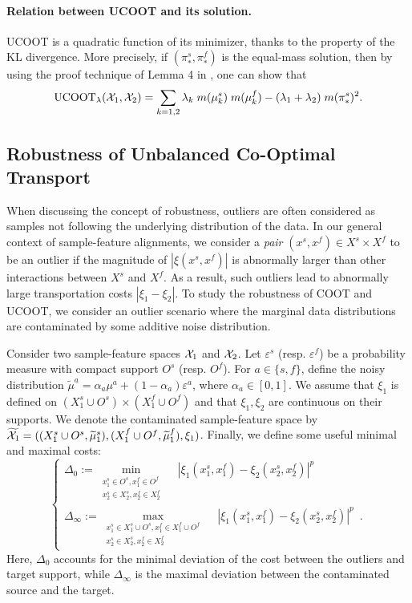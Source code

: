 \paragraph{Relation between UCOOT and its solution.}
UCOOT is a quadratic function of its minimizer, thanks to the property of the
KL divergence. More precisely, if $(\pi_*^s, \pi_*^f)$ is the equal-mass solution,
then by using the proof technique of Lemma 4 in \citep{Khiem20}, one can show that
\begin{align}
  \label{eq:ucoot_minimizer_minimum}
  \text{UCOOT}_{\lambda}(\mathcal X_1, \mathcal X_2) =
  \sum_{k=1, 2} \lambda_k \; m(\mu_k^s) \; m(\mu_k^f) - (\lambda_1  + \lambda_2) \; m(\pi^s_*)^2.
\end{align}

\subsection{Robustness of Unbalanced Co-Optimal Transport} \label{sec:robustness}
When discussing the concept of robustness, outliers are often considered as samples
not following the underlying distribution of the data. In our general context of
sample-feature alignments, we consider a \emph{pair} $(x^s, x^f) \in X^s \times X^f$
to be an outlier if the magnitude of $|\xi(x^s, x^f)|$ is abnormally larger than
other interactions between $X^s$ and $X^f$. As a result, such outliers lead to
abnormally large transportation costs $|\xi_1 - \xi_2|$. To study the robustness of COOT and UCOOT,
we consider an outlier scenario where the marginal data distributions are contaminated
by some additive noise distribution.
\begin{assumption}
\label{assump:robust}
Consider two sample-feature spaces $\mathcal X_1$ and $\mathcal X_2$.
Let $\varepsilon^s$ (resp. $\varepsilon^f$) be a probability measure with
compact support $O^s$ (resp. $O^f$). For $a \in \{s, f\}$,
define the noisy distribution $\widetilde{\mu}^a = \alpha_a \mu^a + (1-\alpha_a) \varepsilon^a$,
where $\alpha_a \in [0,1]$. We assume that $\xi_1$ is defined on
$(X^s_1 \cup O^s) \times (X^f_1 \cup O^f)$ and
that $\xi_1, \xi_2$ are continuous on their supports.
We denote the contaminated sample-feature space by
$\widetilde{\mathcal X_1} = ((X^s_1 \cup O^s, \widetilde{\mu}^s_1), (X^f_1 \cup O^f, \widetilde{\mu}^f_1), \xi_1)$.
Finally, we define some useful minimal and maximal costs:
  \begin{equation}
    \begin{cases}
  \Delta_{0} := \min\limits_{
  \substack{
       x_1^s \in O^s, x_1^f \in O^f  \\
       x_2^s \in X_2^s, x_2^f \in X_2^f
  }}\quad |\xi_1(x_1^s, x_1^f) - \xi_2(x_2^s, x_2^f)|^p \\
  \Delta_{\infty} := \max\limits_{
  \substack{
  x_1^s \in X_1^s \cup O^s, x_1^f \in X_1^f \cup O^f \\
  x_2^s \in X_2^s, x_2^f \in X_2^f
  }} \quad|\xi_1(x_1^s, x_1^f) - \xi_2(x_2^s, x_2^f)|^p \enspace.
  \end{cases}
  \end{equation}
Here, $\Delta_{0}$ accounts for the minimal deviation of the cost between
the outliers and target support, while $\Delta_{\infty}$ is the maximal deviation
between the contaminated source and the target.
\end{assumption}
